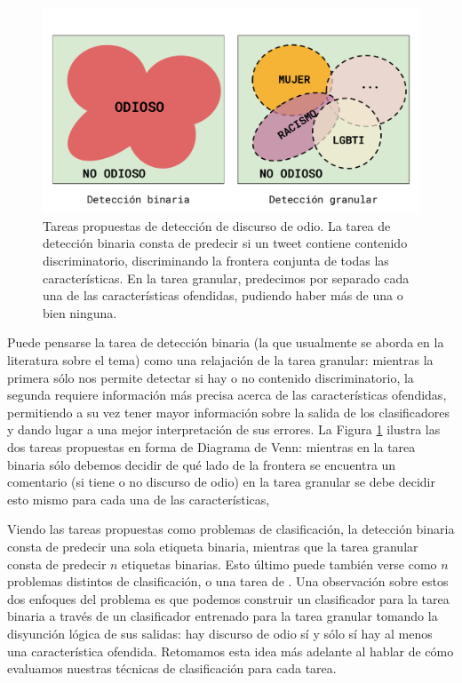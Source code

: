 \begin{figure}[t]
    \centering
    \includegraphics[width=\textwidth]{img/06/hate_detection_tasks.pdf}
    \caption{Tareas propuestas de detección de discurso de odio. La tarea de detección binaria consta de predecir si un tweet contiene contenido discriminatorio, discriminando la frontera conjunta de todas las características. En la tarea granular, predecimos por separado cada una de las características ofendidas, pudiendo haber más de una o bien ninguna.}
    \label{fig:hate_detection_tasks}
\end{figure}



Puede pensarse la tarea de detección binaria (la que usualmente se aborda en la literatura sobre el tema) como una relajación de la tarea granular: mientras la primera sólo nos permite detectar si hay o no contenido discriminatorio, la segunda requiere información más precisa acerca de las características ofendidas, permitiendo a su vez tener mayor información sobre la salida de los clasificadores y dando lugar a una mejor interpretación de sus errores. La Figura \ref{fig:hate_detection_tasks} ilustra las dos tareas propuestas en forma de Diagrama de Venn: mientras en la tarea binaria sólo debemos decidir de qué lado de la frontera se encuentra un comentario (si tiene o no discurso de odio) en la tarea granular se debe decidir esto mismo para cada una de las características,


Viendo las tareas propuestas como problemas de clasificación, la detección binaria consta de predecir una sola etiqueta binaria, mientras que la tarea granular consta de predecir $n$ etiquetas binarias. Esto último puede también verse como $n$ problemas distintos de clasificación, o una tarea de . Una observación sobre estos dos enfoques del problema es que podemos construir un clasificador para la tarea binaria a través de un clasificador entrenado para la tarea granular tomando la disyunción lógica de sus salidas: hay discurso de odio sí y sólo sí hay al menos una característica ofendida. Retomamos esta idea más adelante al hablar de cómo evaluamos nuestras técnicas de clasificación para cada tarea.



